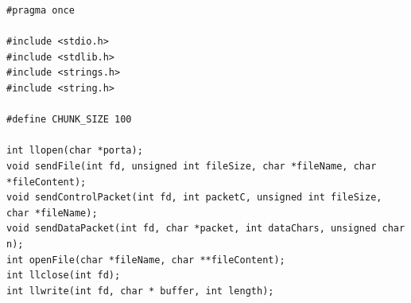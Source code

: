 \documentclass[a4paper,11pt]{article}
\begin{document}
\pagebreak

\lstset{language=C,
		showstringspaces=false,
		frame=tb,
		caption=Write.h}
\begin{lstlisting}
#pragma once

#include <stdio.h>
#include <stdlib.h>
#include <strings.h>
#include <string.h>

#define CHUNK_SIZE 100

int llopen(char *porta);
void sendFile(int fd, unsigned int fileSize, char *fileName, char *fileContent);
void sendControlPacket(int fd, int packetC, unsigned int fileSize, char *fileName);
void sendDataPacket(int fd, char *packet, int dataChars, unsigned char n);
int openFile(char *fileName, char **fileContent);
int llclose(int fd);
int llwrite(int fd, char * buffer, int length);
\end{lstlisting}


\pagebreak
\end{document}
